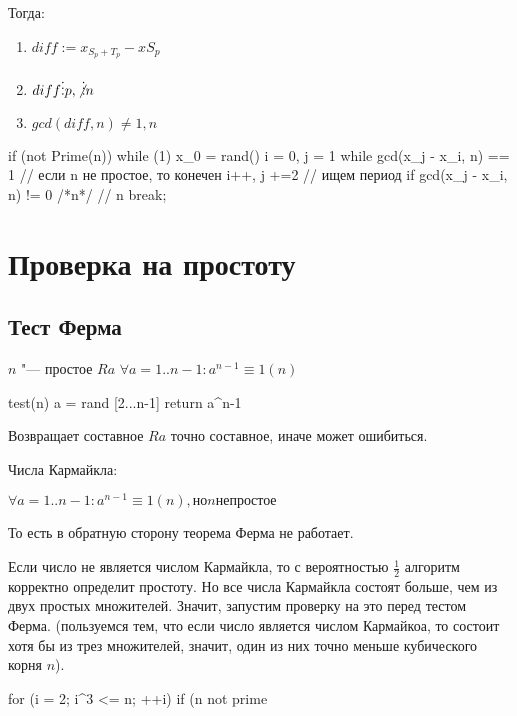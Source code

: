 Тогда:
\begin{enumerate}
	\item $diff := x_{S_p + T_p} - x{S_p}$
	\item $diff \vdots p, \not\vdots n$
	\item $gcd(diff, n) \neq 1, n$
\end{enumerate}

\begin{cppcode}
if (not Prime(n))
while (1)
	x_0 = rand()
	i = 0, j = 1
	while gcd(x_j - x_i, n) == 1	// если n не простое, то конечен
		i++, j +=2			// ищем период
	if gcd(x_j - x_i, n) != 0 /*n*/ 	// \log n
		break;
\end{cppcode}

\section{Проверка на простоту}

\subsection{Тест Ферма}

\begin{lemma}
$n$ "--- простое $Ra$ $ \forall a = 1 .. n-1: a^{n-1} \equiv 1 (n) $
\end{lemma}

\begin{cppcode}
test(n)
	a = rand [2...n-1]
	return a^{n-1} %
\end{cppcode}

Возвращает составное $Ra$ точно составное, иначе может ошибиться.

Числа Кармайкла:

$\forall a = 1 .. n-1: a^{n-1} \equiv 1 (n), но n не простое$

То есть в обратную сторону теорема Ферма не работает.

Если число не является числом Кармайкла, то с вероятностью $ \frac{1}{2} $ алгоритм корректно определит простоту. Но все числа Кармайкла состоят больше, чем из двух простых множителей. Значит, запустим проверку на это перед тестом Ферма. (пользуемся тем, что если число является числом Кармайкоа, то состоит хотя бы из трез множителей, значит, один из них точно меньше кубического корня $n$).

\begin{cppcode}
for (i = 2; i^3 <= n; ++i)
	if (n %
		not prime
\end{cppcode}

